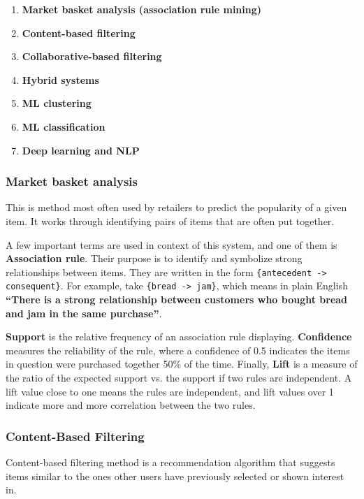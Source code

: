 \documentclass{article}
\begin{document}
\begin{enumerate}
	\item{\textbf{Market basket analysis (association rule mining)}}
	\item{\textbf{Content-based filtering}}
	\item{\textbf{Collaborative-based filtering}}
	\item{\textbf{Hybrid systems}}
	\item{\textbf{ML clustering}}
	\item{\textbf{ML classification}}
	\item{\textbf{Deep learning and NLP}}
\end{enumerate}

\subsubsection{Market basket analysis}

This is method most often used by retailers to predict the popularity of a given item. It works through identifying pairs of items that are often put together.

\medskip

\noindent A few important terms are used in context of this system, and one of them is \textbf{Association rule}. Their purpose is to identify and symbolize strong relationships between items. They are written in the form \texttt{\{antecedent -> consequent\}}. For example, take \texttt{\{bread -> jam\}}, which means in plain English \textbf{``There is a strong relationship between customers who bought bread and jam in the same purchase''}.

\medskip

\noindent \textbf{Support} is the relative frequency of an association rule displaying. \textbf{Confidence} measures the reliability of the rule, where a confidence of 0.5 indicates the items in question were purchased together 50\% of the time. Finally, \textbf{Lift} is a measure of the ratio of the expected support vs. the support if two rules are independent. A lift value close to one means the rules are independent, and lift values over 1 indicate more and more correlation between the two rules.

\subsubsection{Content-Based Filtering}

\noindent Content-based filtering method is a recommendation algorithm that suggests items similar to the ones other users have previously selected or shown interest in.
\end{document}
